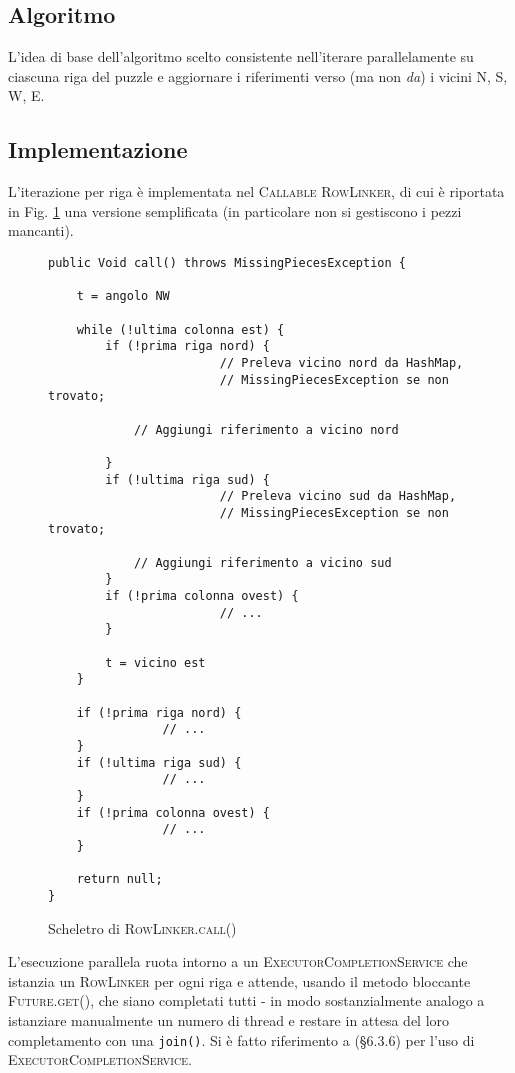 \documentclass[a4paper]{article}
\newcommand{\Classname}[1]{\textsc{#1}}
\newcommand{\Ifacename}[1]{\textsc{#1}}
\newcommand{\Methodname}[1]{\texttt{#1}}
\begin{document}
\subsection{Algoritmo}
L'idea di base dell'algoritmo scelto consistente nell'iterare parallelamente su ciascuna riga del puzzle e aggiornare i riferimenti verso (ma non \emph{da}) i vicini N, S, W, E.

\subsection{Implementazione}
L'iterazione per riga \`e implementata nel \Ifacename{Callable} \Classname{RowLinker}, di cui \`e riportata in Fig. \ref{rowlinker} una versione semplificata (in particolare non si gestiscono i pezzi mancanti).


\begin{figure}[h!]
  \centering
\begin{lstlisting}[frame=single]
public Void call() throws MissingPiecesException {

	t = angolo NW

	while (!ultima colonna est) {
		if (!prima riga nord) {
                        // Preleva vicino nord da HashMap,
                        // MissingPiecesException se non trovato;

			// Aggiungi riferimento a vicino nord

		}
		if (!ultima riga sud) {
                        // Preleva vicino sud da HashMap,
                        // MissingPiecesException se non trovato;

			// Aggiungi riferimento a vicino sud
		}
		if (!prima colonna ovest) {
                        // ...
		}

		t = vicino est
	}

	if (!prima riga nord) {
                // ...
	}
	if (!ultima riga sud) {
                // ...
	}
	if (!prima colonna ovest) {
                // ...
	}

	return null;
}
\end{lstlisting}
\caption {Scheletro di \textsc{RowLinker.call()}}
\label{rowlinker}
\end{figure}


L'esecuzione parallela ruota intorno a un \Classname{ExecutorCompletionService} che istanzia un \Classname{RowLinker} per ogni riga e attende, usando il metodo bloccante \Ifacename{Future.get()}, che siano completati tutti - in modo sostanzialmente analogo a istanziare manualmente un numero di thread e restare in attesa del loro completamento con una \Methodname{join()}.
Si \`e fatto riferimento a \cite{goetz2006java} (§6.3.6) per l'uso di \Classname{ExecutorCompletionService}.
\end{document}
